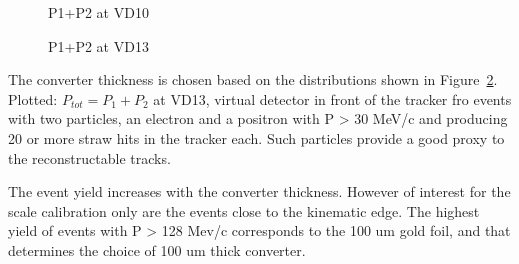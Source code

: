 \begin{figure}[H]
  \caption{
    \label{figure:sum_mom_vd10}
    P1+P2 at VD10
  }
\end{figure}

\begin{figure}[H]
  \caption{
    \label{figure:sum_mom_vd13}
    P1+P2 at VD13
  }
\end{figure}

The converter thickness is chosen based on the distributions shown in Figure~\ref{figure:sum_mom_vd13}.
Plotted: $P_{tot} = P_1 + P_2$ at VD13, virtual detector in front of the tracker fro events with
two particles, an electron and a positron with P > 30 MeV/c and producing 20 or more straw hits in the tracker each.
Such particles provide a good proxy to the reconstructable tracks.

The event yield increases with the converter thickness. However of interest for the scale calibration only
are the events close to the kinematic edge.
The highest yield of events with P > 128 Mev/c corresponds to the 100 um gold foil, and that determines
the choice of 100 um thick converter.

